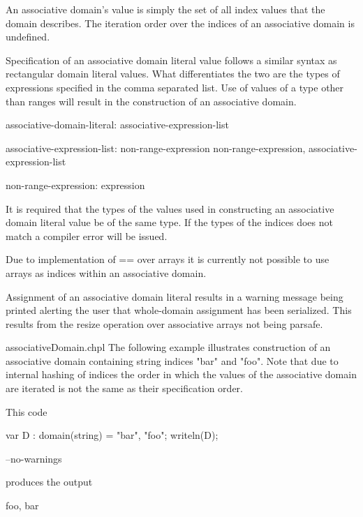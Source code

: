 An associative domain's value is simply the set of all index values
that the domain describes.  The iteration order over the indices of
an associative domain is undefined.


Specification of an associative domain literal value follows a similar syntax as
rectangular domain literal values.  What differentiates the two are the types 
of expressions specified in the comma separated list.  Use of values of a 
type other than ranges will result in the construction of an associative domain.  

\begin{syntax}
associative-domain-literal:
   { associative-expression-list }

associative-expression-list:
   non-range-expression
   non-range-expression, associative-expression-list

non-range-expression:
   expression
\end{syntax}

It is required that the types of the values used in constructing an associative
domain literal value be of the same type.  If the types of the indices does not
match a compiler error will be issued.

\begin{future}
Due to implementation of == over arrays it is currently not possible to use
arrays as indices within an associative domain. 
\end{future}

\begin{openissue}
Assignment of an associative domain literal results in a warning message
being printed alerting the user that whole-domain assignment has been
serialized. This results from the resize operation over associative arrays not
being parsafe. 
\end{openissue}

\begin{chapelexample}{associativeDomain.chpl}
The following example illustrates construction of an associative domain
containing string indices "bar" and "foo".  Note that due to internal hashing 
of indices the order in which the values of the associative domain are iterated
is not the same as their specification order.

This code
\begin{chapel}
var D : domain(string) = {"bar", "foo"};
writeln(D);
\end{chapel}
\begin{chapelcompopts}
--no-warnings
\end{chapelcompopts}
produces the output
\begin{chapelprintoutput}{}
{foo, bar}
\end{chapelprintoutput}
\end{chapelexample}

